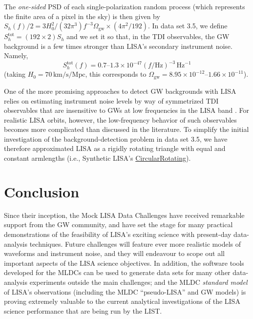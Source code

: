 \documentclass{iopart}
\begin{document}
The \emph{one-sided} PSD of each single-polarization random process (which represents the finite area of a pixel in the sky) is then given by $S_h(f)/2 = 3 H_0^2/(32 \pi^3) f^{-3} \Omega_\mathrm{gw} \times (4 \pi^2 / 192)$.
In data set 3.5, we define $S^\mathrm{tot}_h = (192 \times 2) S_h$ and we set it so that, in the TDI observables, the GW background is a few times stronger than LISA's secondary instrument noise. Namely, 
%
\begin{equation}
S^\mathrm{tot}_h(f) = 0.7\mbox{--}1.3 \times 10^{-47} (f/\mathrm{Hz})^{-3} \, \mathrm{Hz}^{-1}
\end{equation}
%
(taking $H_0 = 70 \, \mathrm{km} / \mathrm{s} / \mathrm{Mpc}$, this corresponds to $\Omega_\mathrm{gw}=8.95\times 10^{-12}\mbox{--}1.66\times 10^{-11}$).

One of the more promising approaches to detect GW backgrounds with LISA relies on estimating instrument noise levels by way of symmetrized TDI observables that are insensitive to GWs at low frequencies in the LISA band \cite{zetapaper,hoganbender,rrv}. For realistic LISA orbits, however, the low-frequency behavior of such observables becomes more complicated than discussed in the literature. To simplify the initial investigation of the background-detection problem in data set 3.5, we have therefore approximated 
LISA as a rigidly rotating triangle with equal and constant armlengths (i.e., Synthetic LISA's \url{CircularRotating}).

\section{Conclusion}

Since their inception, the Mock LISA Data Challenges have received remarkable support from the GW community, and have set the stage for many practical demonstrations of the feasibility of LISA's exciting science with present-day data-analysis techniques. Future challenges will feature ever more realistic models of waveforms and instrument noise, and they will endeavour to scope out all important aspects of the LISA science objectives.
In addition, the software tools developed for the MLDCs \cite{lisatools} can be used to generate data sets for many other data-analysis experiments outside the main challenges; and the MLDC \emph{standard model} of LISA's observations (including the MLDC ``pseudo-LISA'' and GW models) is proving extremely valuable to the current analytical investigations of the LISA science performance that are being run by the LIST.
\end{document}
